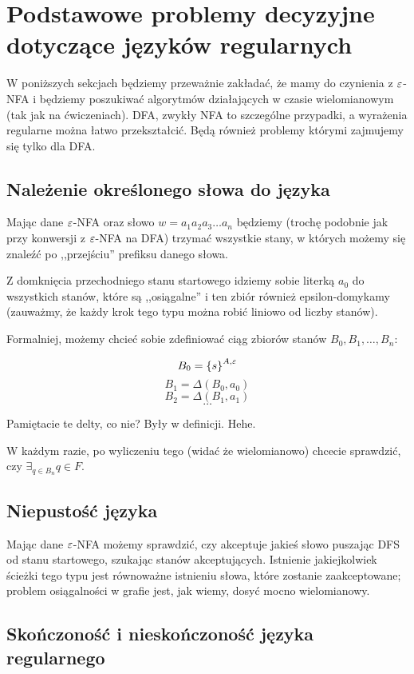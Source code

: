 \section{Podstawowe problemy decyzyjne dotyczące języków regularnych}

W poniższych sekcjach będziemy przeważnie zakładać, że mamy do czynienia z \( \varepsilon\)-NFA i będziemy poszukiwać algorytmów działających w czasie wielomianowym (tak jak na ćwiczeniach). DFA, zwykły NFA to szczególne przypadki, a wyrażenia regularne można łatwo przekształcić. Będą również problemy którymi zajmujemy się tylko dla DFA.

\subsection{Należenie określonego słowa do języka}

Mając dane \(\varepsilon\)-NFA oraz słowo \(w = a_1a_2a_3\dots a_n\) będziemy (trochę podobnie jak przy konwersji z \(\varepsilon\)-NFA na DFA) trzymać wszystkie stany, w których możemy się znaleźć po ,,przejściu'' prefiksu danego słowa.

Z domknięcia przechodniego stanu startowego idziemy sobie literką \(a_0\) do wszystkich stanów, które są ,,osiągalne'' i ten zbiór również epsilon-domykamy (zauważmy, że każdy krok tego typu można robić liniowo od liczby stanów).

Formalniej, możemy chcieć sobie zdefiniować ciąg zbiorów stanów \(B_{0}, B_{1}, \dots, B_{n} \):

\[
	B_{0} = \set{s}^{A, \eps}
\]
\[
	B_1 = \Delta(B_0, a_0)
\]
\[
	B_2 = \Delta(B_1, a_1)
\]
\[
	\dots
\]

Pamiętacie te delty, co nie? Były w definicji. Hehe.

W każdym razie, po wyliczeniu tego (widać że wielomianowo) chcecie sprawdzić, czy \( \exists_{q \in B_n} q \in F \).

\subsection{Niepustość języka}

Mając dane \(\varepsilon\)-NFA możemy sprawdzić, czy akceptuje jakieś słowo puszając DFS od stanu startowego, szukając stanów akceptujących. Istnienie jakiejkolwiek ścieżki tego typu jest równoważne istnieniu słowa, które zostanie zaakceptowane; problem osiągalności w grafie jest, jak wiemy, dosyć mocno wielomianowy.

\subsection{Skończoność i nieskończoność języka regularnego}

